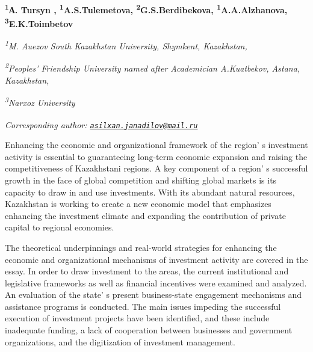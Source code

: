 
\begin{articleheader}

{\bfseries \textsuperscript{1}А. Tursyn\textsuperscript{\envelope } \authorid,
\textsuperscript{1}A.S.Tulemetova\authorid,
\textsuperscript{2}G.S.Berdibekova\authorid,
\textsuperscript{1}A.A.Alzhanova\authorid,
\textsuperscript{3}E.K.Toimbetov\authorid}
\end{articleheader}

\begin{affiliation}
\emph{\textsuperscript{1}M. Auezov South Kazakhstan University,
Shymkent, Kazakhstan,}

\emph{\textsuperscript{2}Peoples'{} Friendship University
named after Academician A.Kuatbekov, Astana, Kazakhstan,}

\emph{\textsuperscript{3}Narxoz University}

\emph{{\bfseries \textsuperscript{\envelope }}Corresponding author:
\href{mailto:asilxan.janadilov@mail.ru}{\nolinkurl{asilxan.janadilov@mail.ru}}}
\end{affiliation}

Enhancing the economic and organizational framework of the
region' s investment activity is essential to
guaranteeing long-term economic expansion and raising the
competitiveness of Kazakhstani regions. A key component of a
region' s successful growth in the face of global
competition and shifting global markets is its capacity to draw in and
use investments. With its abundant natural resources, Kazakhstan is
working to create a new economic model that emphasizes enhancing the
investment climate and expanding the contribution of private capital to
regional economies.

The theoretical underpinnings and real-world strategies for enhancing
the economic and organizational mechanisms of investment activity are
covered in the essay. In order to draw investment to the areas, the
current institutional and legislative frameworks as well as financial
incentives were examined and analyzed. An evaluation of the
state' s present business-state engagement mechanisms and
assistance programs is conducted. The main issues impeding the
successful execution of investment projects have been identified, and
these include inadequate funding, a lack of cooperation between
businesses and government organizations, and the digitization of
investment management.

